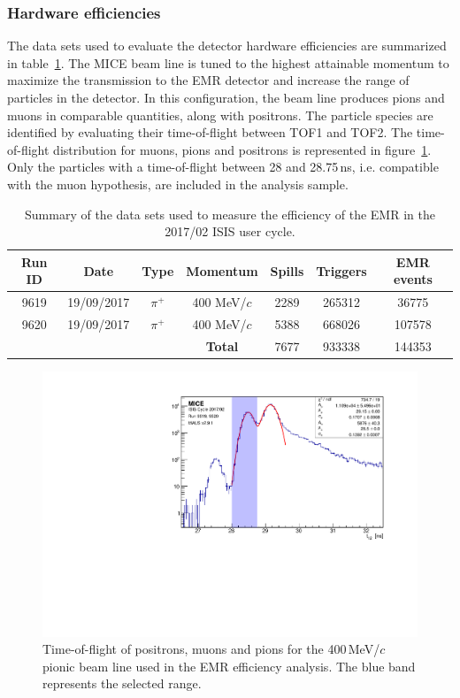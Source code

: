 \subsubsection{Hardware efficiencies}
The data sets used to evaluate the detector hardware efficiencies are summarized in table~\ref{tab:emr_eff_data_sets}. The MICE beam line is tuned to the highest attainable momentum to maximize the transmission to the EMR detector and increase the range of particles in the detector. In this configuration, the beam line produces pions and muons in comparable quantities, along with positrons. The particle species are identified by evaluating their time-of-flight between TOF1 and TOF2. The time-of-flight distribution for muons, pions and positrons is represented in figure~\ref{fig:emr_eff_tof}. Only the particles with a time-of-flight between 28 and 28.75\,ns, i.e. compatible with the muon hypothesis, are included in the analysis sample.

\begin{table}[htb!]
	\centering
	\begin{tabular}{c|c|c|c|c|c|c}
		Run ID & Date & Type & Momentum & Spills & Triggers & EMR events \\
		\hline
		9619 & 19/09/2017 & $\pi^+$ & 400 MeV/$c$ & 2289 & 265312 & 36775 \\
		9620 & 19/09/2017 & $\pi^+$ & 400 MeV/$c$ & 5388 & 668026 & 107578 \\
		\hline
		\multicolumn{3}{c}{} & \textbf{Total} & 7677 & 933338 & 144353
	\end{tabular}
	\caption{Summary of the data sets used to measure the efficiency of the EMR in the 2017/02 ISIS user cycle.}
	\label{tab:emr_eff_data_sets}
\end{table}

\begin{figure}[htb!]
    \begin{center}
    	\includegraphics[width=0.7\columnwidth]{tof12.pdf}  		
    	\caption{Time-of-flight of positrons, muons and pions for the 400\,MeV/$c$ pionic beam line used in the EMR efficiency analysis. The blue band represents the selected range.}
    	\label{fig:emr_eff_tof}
    \end{center}
\end{figure}

